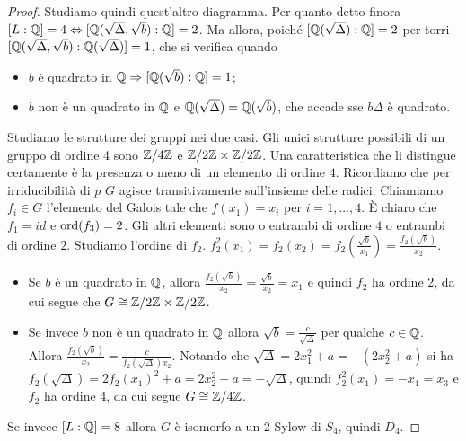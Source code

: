 \begin{proof}
    \begin{minipage}{0.5\textwidth}
    Studiamo quindi quest'altro diagramma. Per quanto detto finora $[L : \mathbb{Q}] = 4 \Leftrightarrow [\mathbb{Q}(\sqrt{\Delta}, \sqrt{b}) : \mathbb{Q}] = 2$. Ma allora, poiché $[\mathbb{Q}(\sqrt{\Delta}) : \mathbb{Q}] = 2$ per torri $[\mathbb{Q}(\sqrt{\Delta}, \sqrt{b}) : \mathbb{Q}(\sqrt{\Delta})] = 1$, che si verifica quando 
    \begin{itemize}
        \item $b$ è quadrato in $\mathbb{Q} \Rightarrow [\mathbb{Q}(\sqrt{b}) : \mathbb{Q}] = 1$;
        \item $b$ non è un quadrato in $\mathbb{Q}$ e $\mathbb{Q}(\sqrt{\Delta}) = \mathbb{Q}(\sqrt{b})$, che accade sse $b\Delta$ è quadrato.
    \end{itemize}
    \end{minipage}\hfill
    \begin{minipage}{0.5\textwidth}  
    \end{minipage}\hfill
    
    Studiamo le strutture dei gruppi nei due casi. Gli unici strutture possibili di un gruppo di ordine 4 sono $\mathbb{Z}/4\mathbb{Z}$ e $\mathbb{Z}/2\mathbb{Z} \times \mathbb{Z}/2\mathbb{Z}$. Una caratteristica che li distingue certamente è la presenza o meno di un elemento di ordine $4$. Ricordiamo che per irriducibilità di $p$ $G$ agisce transitivamente sull'insieme delle radici. Chiamiamo $f_i \in G$ l'elemento del Galois tale che $f(x_1) = x_i$ per $i = 1, \dots, 4$. È chiaro che $f_1 = id$ e $\text{ord}(f_3) = 2$. Gli altri elementi sono o entrambi di ordine $4$ o entrambi di ordine $2$. Studiamo l'ordine di $f_2$. $f_2^2(x_1) = f_2(x_2) = f_2(\frac{\sqrt{b}}{x_1}) = \frac{f_2(\sqrt{b})}{x_2}$. 
    \begin{itemize}
        \item Se $b$ è un quadrato in $\mathbb{Q}$, allora $\frac{f_2(\sqrt{b})}{x_2} = \frac{\sqrt{b}}{x_2} = x_1$ e quindi $f_2$ ha ordine 2, da cui segue che $G \cong \mathbb{Z}/2\mathbb{Z} \times \mathbb{Z}/2\mathbb{Z}$. 
        \item Se invece $b$ non è un quadrato in $\mathbb{Q}$ allora $\sqrt{b} = \frac{c}{\sqrt{\Delta}}$ per qualche $c \in \mathbb{Q}$. Allora $\frac{f_2(\sqrt{b})}{x_2} = \frac{c}{f_2(\sqrt{\Delta}) x_2}$. Notando che $\sqrt{\Delta} = 2x_1^2 + a = -(2x_2^2 + a)$ si ha $f_2(\sqrt{\Delta}) = 2f_2(x_1)^2 + a = 2x_2^2 + a = -\sqrt{\Delta}$, quindi $f_2^2(x_1) = -x_1 = x_3$ e $f_2$ ha ordine $4$, da cui segue $G \cong \mathbb{Z}/4\mathbb{Z}$.
    \end{itemize}
    Se invece $[L : \mathbb{Q}] = 8$ allora $G$ è isomorfo a un $2$-Sylow di $S_4$, quindi $D_4$.
\end{proof}

